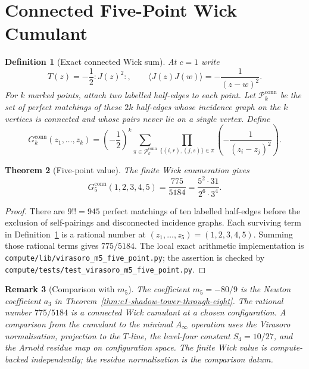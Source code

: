 \documentclass[11pt]{article}
\newtheorem{theorem}{Theorem}[section]
\newtheorem{definition}[theorem]{Definition}
\newtheorem{remark}[theorem]{Remark}
\begin{document}
\section{Connected Five-Point Wick Cumulant}

\begin{definition}[Exact connected Wick sum]
\label{def:exact-wick-sum}
At $c=1$ write
\[
  T(z)=-\frac12{:}J(z)^2{:},\qquad
  \langle J(z)J(w)\rangle=-\frac1{(z-w)^2}.
\]
For $k$ marked points, attach two labelled half-edges to each point.
Let $\mathcal P_k^{\mathrm{conn}}$ be the set of perfect matchings of
these $2k$ half-edges whose incidence graph on the $k$ vertices is
connected and whose pairs never lie on a single vertex. Define
\[
  G_k^{\mathrm{conn}}(z_1,\ldots,z_k)
  =
  \left(-\frac12\right)^k
  \sum_{\pi\in\mathcal P_k^{\mathrm{conn}}}
  \prod_{\{(i,r),(j,s)\}\in\pi}
  \left(-\frac1{(z_i-z_j)^2}\right).
\]
\end{definition}

\begin{theorem}[Five-point value]
\label{thm:g5-value}
The finite Wick enumeration gives
\[
  G_5^{\mathrm{conn}}(1,2,3,4,5)
  =
  \frac{775}{5184}
  =
  \frac{5^2\cdot31}{2^6\cdot3^4}.
\]
\end{theorem}

\begin{proof}
There are $9!!=945$ perfect matchings of ten labelled half-edges before
the exclusion of self-pairings and disconnected incidence graphs. Each
surviving term in Definition~\ref{def:exact-wick-sum} is a rational
number at $(z_1,\ldots,z_5)=(1,2,3,4,5)$. Summing those rational terms
gives $775/5184$. The local exact arithmetic implementation is
\texttt{compute/lib/virasoro\_m5\_five\_point.py}; the assertion is
checked by
\texttt{compute/tests/test\_virasoro\_m5\_five\_point.py}.
\end{proof}

\begin{remark}[Comparison with $m_5$]
\label{rem:g5-m5-comparison}
The coefficient $m_5=-80/9$ is the Newton coefficient $a_3$ in
Theorem~\ref{thm:c1-shadow-tower-through-eight}. The rational number
$775/5184$ is a connected Wick cumulant at a chosen configuration. A
comparison from the cumulant to the minimal $A_\infty$ operation uses
the Virasoro normalisation, projection to the $T$-line, the level-four
constant $S_4=10/27$, and the Arnold residue map on configuration
space. The finite Wick value is compute-backed independently; the
residue normalisation is the comparison datum.
\end{remark}
\end{document}
